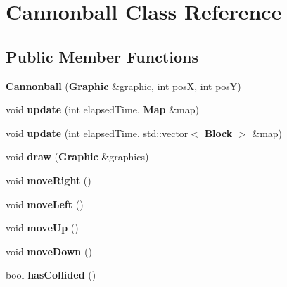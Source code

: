 \section{Cannonball Class Reference}
\label{class_cannonball}
\subsection*{Public Member Functions}
\begin{DoxyCompactItemize}
\item 
{\bfseries Cannonball} ({\bf Graphic} \&graphic, int pos\+X, int pos\+Y)\label{class_cannonball_ae7e8fe5eb3272229d78c221ac4b56a55}

\item 
void {\bfseries update} (int elapsed\+Time, {\bf Map} \&map)\label{class_cannonball_a8bd123a497feecb18da788ec6d724158}

\item 
void {\bfseries update} (int elapsed\+Time, std\+::vector$<$ {\bf Block} $>$ \&map)\label{class_cannonball_a4e9110f4da8a085d2654aa1ed4f2dcb6}

\item 
void {\bfseries draw} ({\bf Graphic} \&graphics)\label{class_cannonball_aa8cb4cb637acbf6b6132f34b0588fd46}

\item 
void {\bfseries move\+Right} ()\label{class_cannonball_ade6097b63fc6d66c14014843a5e84c2e}

\item 
void {\bfseries move\+Left} ()\label{class_cannonball_a00f73b76d893d76a48cf74d3d123c874}

\item 
void {\bfseries move\+Up} ()\label{class_cannonball_af8bcca2d4dd7a84d52bd2d89203ce9cd}

\item 
void {\bfseries move\+Down} ()\label{class_cannonball_af69eb8fff953a77721d63063d82b2650}

\item 
bool {\bfseries has\+Collided} ()\label{class_cannonball_a3c2e8ae577405cd797f7e5bfbeab2e59}

\end{DoxyCompactItemize}
